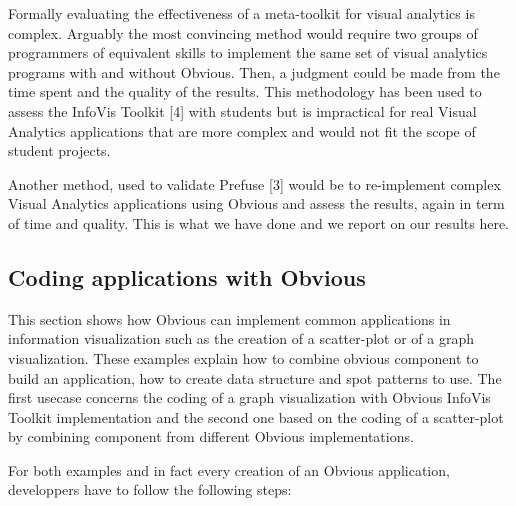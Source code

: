 Formally evaluating the effectiveness of a meta-toolkit for visual analytics is complex. Arguably the most convincing method would require two groups of programmers of equivalent skills to implement the same set of visual analytics programs with and without Obvious. Then, a judgment could be made from the time spent and the quality of the results. This methodology has been used to assess the InfoVis Toolkit [4] with students but is impractical for real Visual Analytics applications that are more complex and would not fit the scope of student projects.

Another method, used to validate Prefuse [3] would be to re-implement complex Visual Analytics applications using Obvious and assess the results, again in term of time and quality. This is what we have done and we report on our results here.

\subsection{Coding applications with Obvious}

This section shows how Obvious can implement common applications in information visualization such as the creation of a scatter-plot or of a graph visualization. These examples explain how to combine obvious component to build an application, how to create data structure and spot patterns to use. The first usecase concerns the coding of a graph visualization with Obvious InfoVis Toolkit implementation and the second one based on the coding of a scatter-plot by combining component from different Obvious implementations.

For both examples and in fact every creation of an Obvious application, developpers have to follow the following steps:

